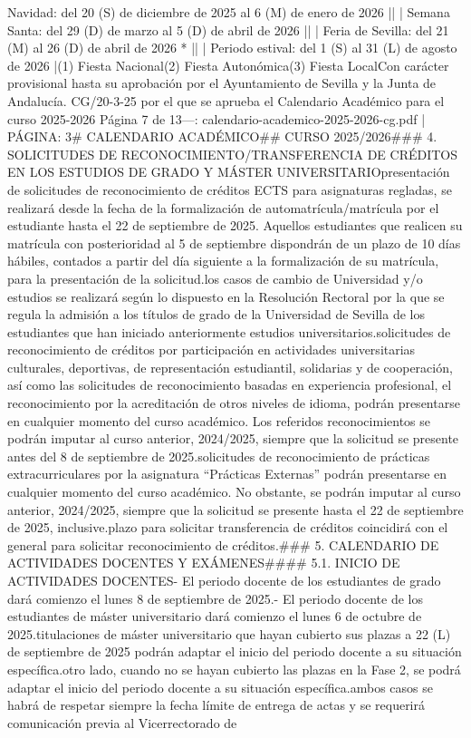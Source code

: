 \documentclass{article}
\begin{document}
\begin{itemize}
{Navidad: del 20 (S) de diciembre de 2025 al 6 (M) de enero de 2026 |\n|                  | Semana Santa: del 29 (D) de marzo al 5 (D) de abril de 2026 |\n|                  | Feria de Sevilla: del 21 (M) al 26 (D) de abril de 2026 * |\n|                  | Periodo estival: del 1 (S) al 31 (L) de agosto de 2026 |\n\n(1) Fiesta Nacional\n(2) Fiesta Autonómica\n(3) Fiesta Local\n\n* Con carácter provisional hasta su aprobación por el Ayuntamiento de Sevilla y la Junta de Andalucía.\n{} CG/20-3-25 por el que se aprueba el Calendario Académico para el curso 2025-2026  Página 7 de 13\n\n---\n\nFUENTE: calendario-academico-2025-2026-cg.pdf | PÁGINA: 3\n# CALENDARIO ACADÉMICO\n## CURSO 2025/2026\n\n### 4. SOLICITUDES DE RECONOCIMIENTO/TRANSFERENCIA DE CRÉDITOS EN LOS ESTUDIOS DE GRADO Y MÁSTER UNIVERSITARIO\n\nLa presentación de solicitudes de reconocimiento de créditos ECTS para asignaturas regladas, se realizará desde la fecha de la formalización de automatrícula/matrícula por el estudiante hasta el 22 de septiembre de 2025. Aquellos estudiantes que realicen su matrícula con posterioridad al 5 de septiembre dispondrán de un plazo de 10 días hábiles, contados a partir del día siguiente a la formalización de su matrícula, para la presentación de la solicitud.\n\nEn los casos de cambio de Universidad y/o estudios se realizará según lo dispuesto en la Resolución Rectoral por la que se regula la admisión a los títulos de grado de la Universidad de Sevilla de los estudiantes que han iniciado anteriormente estudios universitarios.\n\nLas solicitudes de reconocimiento de créditos por participación en actividades universitarias culturales, deportivas, de representación estudiantil, solidarias y de cooperación, así como las solicitudes de reconocimiento basadas en experiencia profesional, el reconocimiento por la acreditación de otros niveles de idioma, podrán presentarse en cualquier momento del curso académico. Los referidos reconocimientos se podrán imputar al curso anterior, 2024/2025, siempre que la solicitud se presente antes del 8 de septiembre de 2025.\n\nLas solicitudes de reconocimiento de prácticas extracurriculares por la asignatura “Prácticas Externas” podrán presentarse en cualquier momento del curso académico. No obstante, se podrán imputar al curso anterior, 2024/2025, siempre que la solicitud se presente hasta el 22 de septiembre de 2025, inclusive.\n\nEl plazo para solicitar transferencia de créditos coincidirá con el general para solicitar reconocimiento de créditos.\n\n### 5. CALENDARIO DE ACTIVIDADES DOCENTES Y EXÁMENES\n\n#### 5.1. INICIO DE ACTIVIDADES DOCENTES\n\n- El periodo docente de los estudiantes de grado dará comienzo el lunes 8 de septiembre de 2025.\n- El periodo docente de los estudiantes de máster universitario dará comienzo el lunes 6 de octubre de 2025.\n\nAquellas titulaciones de máster universitario que hayan cubierto sus plazas a 22 (L) de septiembre de 2025 podrán adaptar el inicio del periodo docente a su situación específica.\n\nPor otro lado, cuando no se hayan cubierto las plazas en la Fase 2, se podrá adaptar el inicio del periodo docente a su situación específica.\n\nEn ambos casos se habrá de respetar siempre la fecha límite de entrega de actas y se requerirá comunicación previa al Vicerrectorado de }
\end{itemize}
\end{document}
